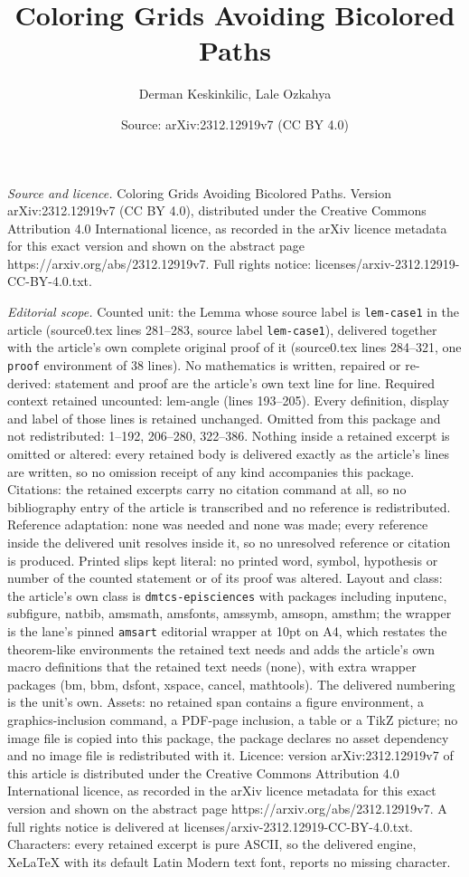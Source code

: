 \documentclass[10pt,a4paper]{amsart}
\title[Coloring Grids Avoiding Bicolored Paths]{Coloring Grids Avoiding Bicolored Paths}
\author{Derman Keskinkilic, Lale Ozkahya}
\date{Source: arXiv:2312.12919v7 (CC BY 4.0)}
\begin{document}
\maketitle

\noindent\emph{Source and licence.} Coloring Grids Avoiding Bicolored Paths. Version arXiv:2312.12919v7 (CC BY 4.0), distributed under the Creative Commons Attribution 4.0 International licence, as recorded in the arXiv licence metadata for this exact version and shown on the abstract page https://arxiv.org/abs/2312.12919v7. Full rights notice: licenses/arxiv-2312.12919-CC-BY-4.0.txt.\par\smallskip

\noindent\textit{Editorial scope.} Counted unit: the Lemma whose source label is \texttt{lem-case1} in the article (source0.tex lines 281--283, source label \texttt{lem-case1}), delivered together with the article's own complete original proof of it (source0.tex lines 284--321, one \texttt{proof} environment of 38 lines). No mathematics is written, repaired or re-derived: statement and proof are the article's own text line for line. Required context retained uncounted: lem-angle (lines 193--205). Every definition, display and label of those lines is retained unchanged. Omitted from this package and not redistributed: 1--192, 206--280, 322--386. Nothing inside a retained excerpt is omitted or altered: every retained body is delivered exactly as the article's lines are written, so no omission receipt of any kind accompanies this package. Citations: the retained excerpts carry no citation command at all, so no bibliography entry of the article is transcribed and no reference is redistributed. Reference adaptation: none was needed and none was made; every reference inside the delivered unit resolves inside it, so no unresolved reference or citation is produced. Printed slips kept literal: no printed word, symbol, hypothesis or number of the counted statement or of its proof was altered. Layout and class: the article's own class is \texttt{dmtcs-episciences} with packages including inputenc, subfigure, natbib, amsmath, amsfonts, amssymb, amsopn, amsthm; the wrapper is the lane's pinned \texttt{amsart} editorial wrapper at 10pt on A4, which restates the theorem-like environments the retained text needs and adds the article's own macro definitions that the retained text needs (none), with extra wrapper packages (bm, bbm, dsfont, xspace, cancel, mathtools). The delivered numbering is the unit's own. Assets: no retained span contains a figure environment, a graphics-inclusion command, a PDF-page inclusion, a table or a TikZ picture; no image file is copied into this package, the package declares no asset dependency and no image file is redistributed with it. Licence: version arXiv:2312.12919v7 of this article is distributed under the Creative Commons Attribution 4.0 International licence, as recorded in the arXiv licence metadata for this exact version and shown on the abstract page https://arxiv.org/abs/2312.12919v7. A full rights notice is delivered at licenses/arxiv-2312.12919-CC-BY-4.0.txt. Characters: every retained excerpt is pure ASCII, so the delivered engine, XeLaTeX with its default Latin Modern text font, reports no missing character.
\end{document}
